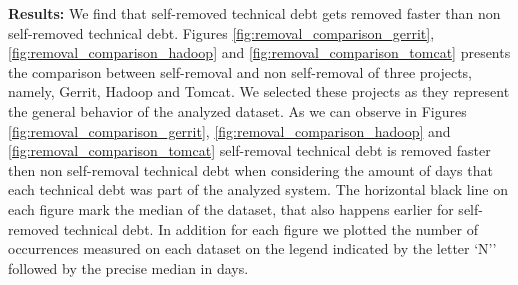 \vspace{1mm}
\noindent \textbf{Results:} We find that self-removed technical debt gets removed faster than non self-removed technical debt. Figures \ref{fig:removal_comparison_gerrit}, \ref{fig:removal_comparison_hadoop} and \ref{fig:removal_comparison_tomcat} presents the comparison between self-removal and non self-removal of three projects, namely, Gerrit, Hadoop and Tomcat. We selected these projects as they represent the general behavior of the analyzed dataset. As we can observe in Figures \ref{fig:removal_comparison_gerrit}, \ref{fig:removal_comparison_hadoop} and \ref{fig:removal_comparison_tomcat} self-removal technical debt is removed faster then non self-removal technical debt when considering the amount of days that each technical debt was part of the analyzed system. The horizontal black line on each figure mark the median of the dataset, that also happens earlier for self-removed technical debt. In addition for each figure we plotted the number of occurrences measured on each dataset on the legend indicated by the letter `N'' followed by the precise median in days.

